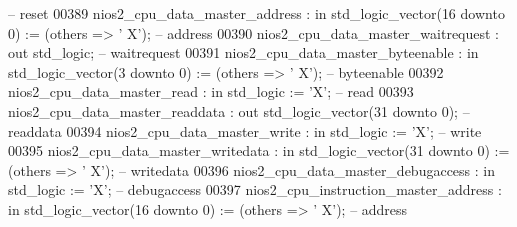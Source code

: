 \begin{DoxyCode}
           \textcolor{keyword}{-- reset}
00389             nios2\_cpu\_data\_master\_address               : \textcolor{keywordflow}{in}  \textcolor{comment}{std\_logic\_vector}(\textcolor{vhdllogic}{}\textcolor{vhdllogic}{16} \textcolor{keywordflow}{downto} \textcolor{vhdllogic}{}\textcolor{vhdllogic}{0}) := (\textcolor{keywordflow}{others} => '
      X'); \textcolor{keyword}{-- address}
00390             nios2\_cpu\_data\_master\_waitrequest           : \textcolor{keywordflow}{out} \textcolor{comment}{std\_logic};                                   
           \textcolor{keyword}{-- waitrequest}
00391             nios2\_cpu\_data\_master\_byteenable            : \textcolor{keywordflow}{in}  \textcolor{comment}{std\_logic\_vector}(\textcolor{vhdllogic}{}\textcolor{vhdllogic}{3} \textcolor{keywordflow}{downto} \textcolor{vhdllogic}{}\textcolor{vhdllogic}{0})  := (\textcolor{keywordflow}{others} => '
      X'); \textcolor{keyword}{-- byteenable}
00392             nios2\_cpu\_data\_master\_read                  : \textcolor{keywordflow}{in}  \textcolor{comment}{std\_logic}                     := 'X';        
           \textcolor{keyword}{-- read}
00393             nios2\_cpu\_data\_master\_readdata              : \textcolor{keywordflow}{out} \textcolor{comment}{std\_logic\_vector}(\textcolor{vhdllogic}{}\textcolor{vhdllogic}{31} \textcolor{keywordflow}{downto} \textcolor{vhdllogic}{}\textcolor{vhdllogic}{0});               
           \textcolor{keyword}{-- readdata}
00394             nios2\_cpu\_data\_master\_write                 : \textcolor{keywordflow}{in}  \textcolor{comment}{std\_logic}                     := 'X';        
           \textcolor{keyword}{-- write}
00395             nios2\_cpu\_data\_master\_writedata             : \textcolor{keywordflow}{in}  \textcolor{comment}{std\_logic\_vector}(\textcolor{vhdllogic}{}\textcolor{vhdllogic}{31} \textcolor{keywordflow}{downto} \textcolor{vhdllogic}{}\textcolor{vhdllogic}{0}) := (\textcolor{keywordflow}{others} => '
      X'); \textcolor{keyword}{-- writedata}
00396             nios2\_cpu\_data\_master\_debugaccess           : \textcolor{keywordflow}{in}  \textcolor{comment}{std\_logic}                     := 'X';        
           \textcolor{keyword}{-- debugaccess}
00397             nios2\_cpu\_instruction\_master\_address        : \textcolor{keywordflow}{in}  \textcolor{comment}{std\_logic\_vector}(\textcolor{vhdllogic}{}\textcolor{vhdllogic}{16} \textcolor{keywordflow}{downto} \textcolor{vhdllogic}{}\textcolor{vhdllogic}{0}) := (\textcolor{keywordflow}{others} => '
      X'); \textcolor{keyword}{-- address}

\end{DoxyCode}
